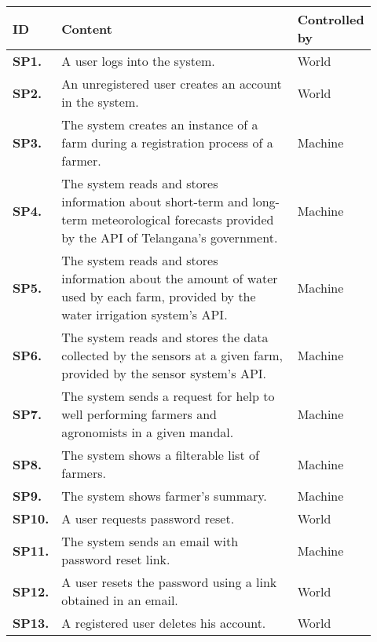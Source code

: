 \begin{longtable}{@{}p{0.06\linewidth} p{0.66\linewidth} p{0.20\linewidth}@{}}
	\toprule
	\textbf{ID}  & \textbf{Content} & \textbf{Controlled by}\\
	\midrule
	
    \textbf{SP1.} & A user logs into the system. & World \\
    \textbf{SP2.} & An unregistered user creates an account in the system. & World \\
    \textbf{SP3.} & The system creates an instance of a farm during a registration process of a farmer. & Machine \\
    
    \textbf{SP4.} & The system reads and stores information about short-term and long-term meteorological forecasts provided by the API of Telangana's government. & Machine \\
    \textbf{SP5.} & The system reads and stores information about the amount of water used by each farm, provided by the water irrigation system's API. & Machine \\
    \textbf{SP6.} & The system reads and stores the data collected by the sensors at a given farm, provided by the sensor system's API. & Machine \\
    \textbf{SP7.} & The system sends a request for help to well performing farmers and agronomists in a given mandal.  & Machine \\
    
    \textbf{SP8.} & The system shows a filterable list of farmers. & Machine \\
    \textbf{SP9.} & The system shows farmer's summary. & Machine \\
    \textbf{SP10.} & A user requests password reset. & World\\
    \textbf{SP11.} & The system sends an email with password reset link. & Machine \\
    \textbf{SP12.} & A user resets the password using a link obtained in an email. & World \\
    \textbf{SP13.} & A registered user deletes his account. & World \\
    

\end{longtable}
